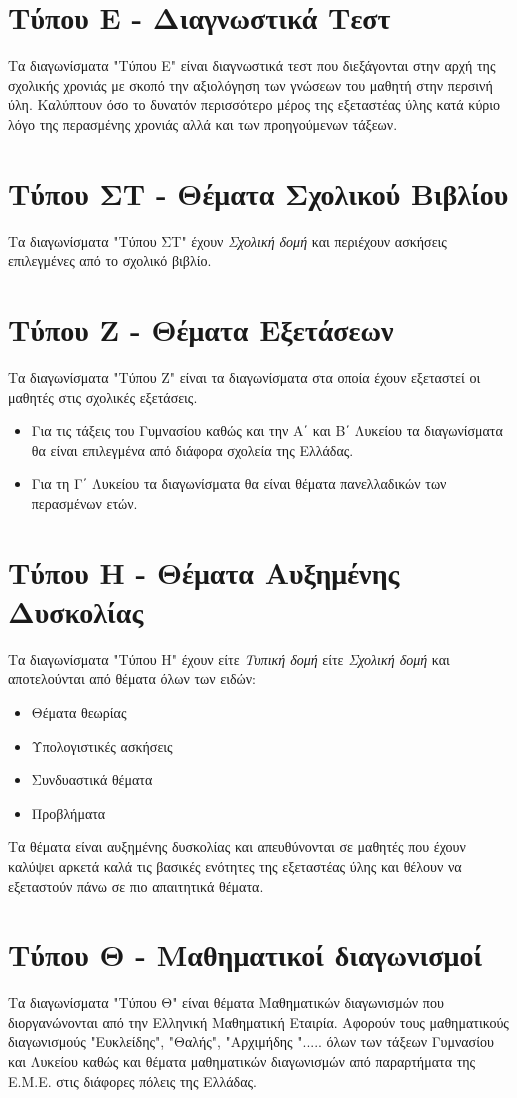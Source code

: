 \documentclass[11pt,a4paper]{book}
\begin{document}
\section{Τύπου Ε - Διαγνωστικά Τεστ}
\noindent
Τα διαγωνίσματα "Τύπου Ε" είναι διαγνωστικά τεστ που διεξάγονται στην αρχή της σχολικής χρονιάς με σκοπό την αξιολόγηση των γνώσεων του μαθητή στην περσινή ύλη. Καλύπτουν όσο το δυνατόν περισσότερο μέρος της εξεταστέας ύλης κατά κύριο λόγο της περασμένης χρονιάς αλλά και των προηγούμενων τάξεων. 
\section{Τύπου ΣΤ - Θέματα Σχολικού Βιβλίου}
\noindent
Τα διαγωνίσματα "Τύπου ΣΤ" έχουν \textit{Σχολική δομή} και περιέχουν ασκήσεις επιλεγμένες από το σχολικό βιβλίο.
\section{Τύπου Ζ - Θέματα Εξετάσεων}
\noindent
Τα διαγωνίσματα "Τύπου Ζ" είναι τα διαγωνίσματα στα οποία έχουν εξεταστεί οι μαθητές στις σχολικές εξετάσεις.
\begin{itemize}[itemsep=0mm]
\item Για τις τάξεις του Γυμνασίου καθώς και την Α΄ και Β΄ Λυκείου τα διαγωνίσματα θα είναι επιλεγμένα από διάφορα σχολεία της Ελλάδας.
\item Για τη Γ΄ Λυκείου τα διαγωνίσματα θα είναι θέματα πανελλαδικών των περασμένων ετών.
\end{itemize}
\section{Τύπου Η - Θέματα Αυξημένης Δυσκολίας}
Τα διαγωνίσματα "Τύπου Η" έχουν είτε \textit{Τυπική δομή} είτε \textit{Σχολική δομή} και αποτελούνται από θέματα όλων των ειδών:
\begin{itemize}[itemsep=0mm]
\item Θέματα θεωρίας
\item Υπολογιστικές ασκήσεις
\item Συνδυαστικά θέματα
\item Προβλήματα
\end{itemize}
Τα θέματα είναι αυξημένης δυσκολίας και απευθύνονται σε μαθητές που έχουν καλύψει αρκετά καλά τις βασικές ενότητες της εξεταστέας ύλης και θέλουν να εξεταστούν πάνω σε πιο απαιτητικά θέματα.
\section{Τύπου Θ - Μαθηματικοί διαγωνισμοί}
\noindent
Τα διαγωνίσματα "Τύπου Θ" είναι θέματα Μαθηματικών διαγωνισμών που διοργανώνονται από την Ελληνική Μαθηματική Εταιρία. Αφορούν τους μαθηματικούς διαγωνισμούς "Ευκλείδης", "Θαλής", "Αρχιμήδης "..... όλων των τάξεων Γυμνασίου και Λυκείου καθώς και θέματα μαθηματικών διαγωνισμών από παραρτήματα της Ε.Μ.Ε. στις διάφορες πόλεις της Ελλάδας.
\end{document}
